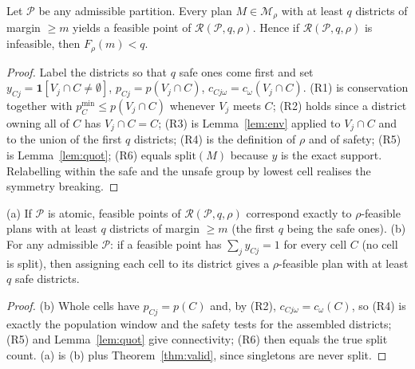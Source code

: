 \begin{theorem}\label{thm:valid}
Let $\mathcal P$ be any admissible partition. Every plan $M\in\mathcal M_\rho$ with at least $q$ districts of margin $\ge m$ yields a feasible point of $\mathcal R(\mathcal P,q,\rho)$. Hence if $\mathcal R(\mathcal P,q,\rho)$ is infeasible, then $F_\rho(m)<q$.
\end{theorem}
\begin{proof}
Label the districts so that $q$ safe ones come first and set $y_{Cj}=\mathbf 1[V_j\cap C\ne\emptyset]$, $p_{Cj}=p(V_j\cap C)$, $c_{Cj\omega}=c_\omega(V_j\cap C)$. (R1) is conservation together with $p^{\min}_C\le p(V_j\cap C)$ whenever $V_j$ meets $C$; (R2) holds since a district owning all of $C$ has $V_j\cap C=C$; (R3) is Lemma~\ref{lem:env} applied to $V_j\cap C$ and to the union of the first $q$ districts; (R4) is the definition of $\rho$ and of safety; (R5) is Lemma~\ref{lem:quot}; (R6) equals $\mathrm{split}(M)$ because $y$ is the exact support. Relabelling within the safe and the unsafe group by lowest cell realises the symmetry breaking.
\end{proof}

\begin{theorem}[Exactness]\label{thm:exact}
(a) If $\mathcal P$ is atomic, feasible points of $\mathcal R(\mathcal P,q,\rho)$ correspond exactly to $\rho$-feasible plans with at least $q$ districts of margin $\ge m$ (the first $q$ being the safe ones).
(b) For any admissible $\mathcal P$: if a feasible point has $\sum_jy_{Cj}=1$ for every cell $C$ (no cell is split), then assigning each cell to its district gives a $\rho$-feasible plan with at least $q$ safe districts.
\end{theorem}
\begin{proof}
(b) Whole cells have $p_{Cj}=p(C)$ and, by (R2), $c_{Cj\omega}=c_\omega(C)$, so (R4) is exactly the population window and the safety tests for the assembled districts; (R5) and Lemma~\ref{lem:quot} give connectivity; (R6) then equals the true split count. (a) is (b) plus Theorem~\ref{thm:valid}, since singletons are never split.
\end{proof}


